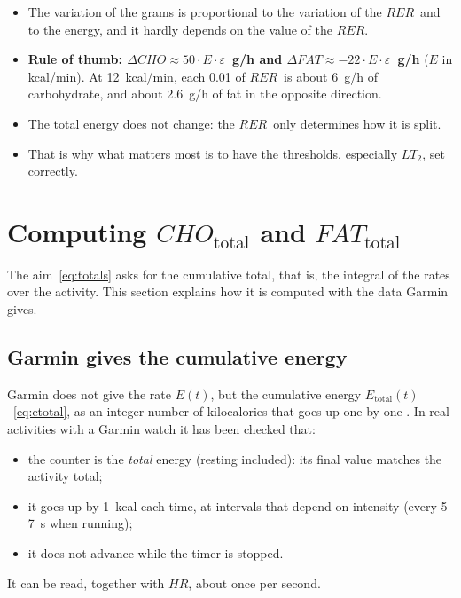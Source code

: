 \documentclass[10pt,a4paper]{article}
\newcommand{\sub}[1]{{\scriptscriptstyle\mathrm{#1}}}   %
\newcommand{\tot}{\sub{total}}
\newcommand{\cho}{\ensuremath{\mathit{CHO}}}               %
\newcommand{\fat}{\ensuremath{\mathit{FAT}}}
\newcommand{\RER}{\ensuremath{\mathit{RER}}}
\newcommand{\FC}{\ensuremath{\mathit{HR}}}
\begin{document}
\begin{conclusio}
\begin{itemize}[leftmargin=*]
  \item The variation of the grams is proportional to the variation of the \RER\ and to the
        energy, and it hardly depends on the value of the \RER.
  \item \textbf{Rule of thumb: $\Delta\cho\approx50\cdot E\cdot\varepsilon$~g/h and
        $\Delta\fat\approx-22\cdot E\cdot\varepsilon$~g/h} ($E$ in kcal/min). At
        12~kcal/min, each 0.01 of \RER\ is about 6~g/h of carbohydrate, and about 2.6~g/h of
        fat in the opposite direction.
  \item The total energy does not change: the \RER\ only determines how it is split.
  \item That is why what matters most is to have the thresholds, especially $LT_2$, set
        correctly.
\end{itemize}
\end{conclusio}

\section{Computing \texorpdfstring{$\mathit{CHO}_{\mathrm{total}}$ and $\mathit{FAT}_{\mathrm{total}}$}{CHO total and FAT total}}\label{sec:total}

The aim~\eqref{eq:totals} asks for the cumulative total, that is, the integral of the rates
over the activity. This section explains how it is computed with the data Garmin gives.

\subsection{Garmin gives the cumulative energy}
Garmin does not give the rate $E(t)$, but the cumulative energy $E_{\tot}(t)$~\eqref{eq:etotal},
as an integer number of kilocalories that goes up one by one \citep{garminciq}. In real
activities with a Garmin watch it has been checked that:
\begin{itemize}
  \item the counter is the \emph{total} energy (resting included): its final value matches
        the activity total;
  \item it goes up by 1~kcal each time, at intervals that depend on intensity (every
        5--7~s when running);
  \item it does not advance while the timer is stopped.
\end{itemize}
It can be read, together with \FC, about once per second.
\end{document}

